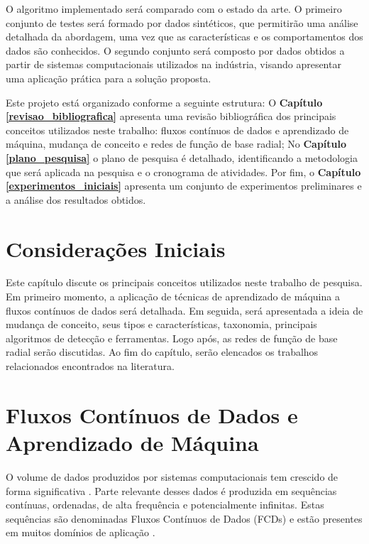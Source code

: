 \documentclass[qual, classic, a4paper]{ufbathesis}
\begin{document}
O algoritmo implementado será comparado com o estado da arte. 
O primeiro conjunto de testes será formado por dados sintéticos, que permitirão uma análise detalhada da abordagem, uma vez que as características e os comportamentos dos dados são conhecidos. 
O segundo conjunto será composto por dados obtidos a partir de sistemas computacionais utilizados na indústria,
visando apresentar uma aplicação prática para a solução proposta. 

Este projeto está organizado conforme a seguinte estrutura: 
O \textbf{Capítulo \ref{revisao_bibliografica}} apresenta uma revisão bibliográfica dos principais conceitos utilizados neste trabalho: fluxos contínuos de dados e aprendizado de máquina, mudança de conceito e redes de função de base radial; 
No \textbf{Capítulo \ref{plano_pesquisa}} o plano de pesquisa é detalhado, 
identificando a metodologia que será aplicada na pesquisa e o cronograma de atividades. 
Por fim, o \textbf{Capítulo \ref{experimentos_iniciais}} 
apresenta um conjunto de experimentos preliminares e a análise dos resultados obtidos.

 \label{revisao_bibliografica}
\section{Considerações Iniciais}

Este capítulo discute os principais conceitos utilizados neste trabalho de pesquisa.
Em primeiro momento, a aplicação de técnicas de aprendizado de máquina a fluxos contínuos de dados será detalhada.
Em seguida, será apresentada a ideia de mudança de conceito, seus tipos e características, taxonomia, principais algoritmos de detecção e ferramentas.
Logo após, as redes de função de base radial serão discutidas.
Ao fim do capítulo, serão elencados os trabalhos relacionados encontrados na literatura.

\section{Fluxos Contínuos de Dados e Aprendizado de Máquina}

O volume de dados produzidos por sistemas computacionais tem crescido de forma significativa \cite{Cohen:BigData:2009:MSN:1687553.1687576}.
Parte relevante desses dados é produzida em sequências contínuas, ordenadas, de alta frequência e potencialmente infinitas.
Estas sequências são denominadas Fluxos Contínuos de Dados (FCDs) e estão presentes em muitos domínios de aplicação \cite{Aggarwal:2006:DSM:1196418}.
\end{document}
